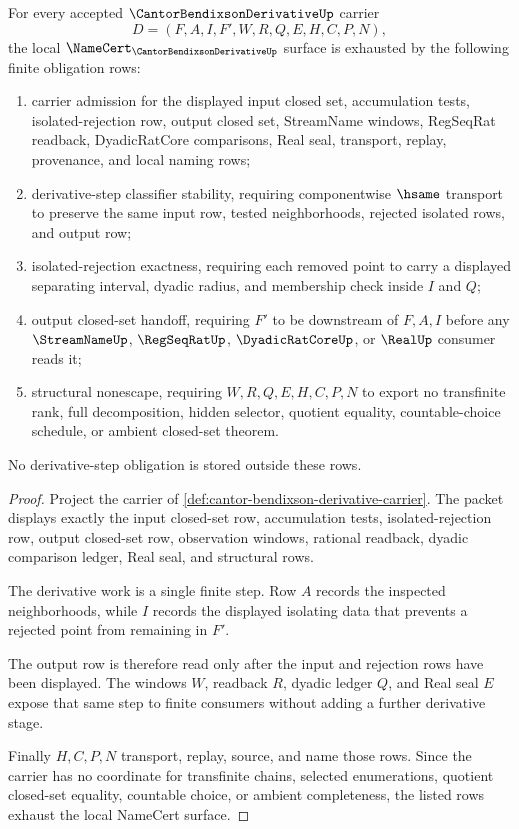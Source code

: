\begin{theorem}
\label{thm:cantor-bendixson-derivative-namecert-obligations}
For every accepted $\CantorBendixsonDerivativeUp$ carrier
$$
D=(F,A,I,F',W,R,Q,E,H,C,P,N),
$$
the local $\NameCert_{\CantorBendixsonDerivativeUp}$ surface is exhausted by the following finite obligation rows:
\begin{enumerate}
\item carrier admission for the displayed input closed set, accumulation tests, isolated-rejection row, output closed set, StreamName windows, RegSeqRat readback, DyadicRatCore comparisons, Real seal, transport, replay, provenance, and local naming rows;
\item derivative-step classifier stability, requiring componentwise $\hsame$ transport to preserve the same input row, tested neighborhoods, rejected isolated rows, and output row;
\item isolated-rejection exactness, requiring each removed point to carry a displayed separating interval, dyadic radius, and membership check inside $I$ and $Q$;
\item output closed-set handoff, requiring $F'$ to be downstream of $F,A,I$ before any $\StreamNameUp$, $\RegSeqRatUp$, $\DyadicRatCoreUp$, or $\RealUp$ consumer reads it;
\item structural nonescape, requiring $W,R,Q,E,H,C,P,N$ to export no transfinite rank, full decomposition, hidden selector, quotient equality, countable-choice schedule, or ambient closed-set theorem.
\end{enumerate}
No derivative-step obligation is stored outside these rows.
\end{theorem}
\begin{proof}
Project the carrier of \autoref{def:cantor-bendixson-derivative-carrier}. The packet displays exactly the input closed-set row, accumulation tests, isolated-rejection row, output closed-set row, observation windows, rational readback, dyadic comparison ledger, Real seal, and structural rows.

The derivative work is a single finite step. Row $A$ records the inspected neighborhoods, while $I$ records the displayed isolating data that prevents a rejected point from remaining in $F'$.

The output row is therefore read only after the input and rejection rows have been displayed. The windows $W$, readback $R$, dyadic ledger $Q$, and Real seal $E$ expose that same step to finite consumers without adding a further derivative stage.

Finally $H,C,P,N$ transport, replay, source, and name those rows. Since the carrier has no coordinate for transfinite chains, selected enumerations, quotient closed-set equality, countable choice, or ambient completeness, the listed rows exhaust the local NameCert surface.
\end{proof}

